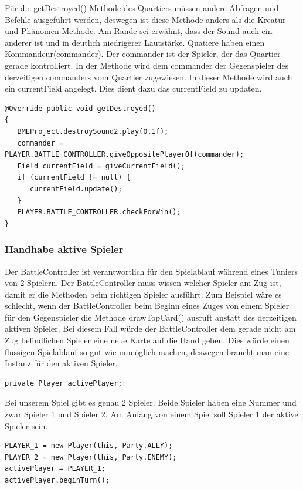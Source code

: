 Für die getDestroyed()-Methode des Quartiers müssen andere Abfragen und Befehle ausgeführt werden, deswegen ist diese Methode anders als die Kreatur- und Phänomen-Methode. Am Rande sei erwähnt, dass der Sound auch ein anderer ist und in deutlich niedrigerer Lautstärke.
Quatiere haben einen Kommandeur(commander). Der commander ist der Spieler, der das Quartier gerade kontrolliert. In der Methode wird dem commander der Gegenspieler des derzeitigen commanders vom Quartier zugewiesen. In dieser Methode wird auch ein currentField angelegt.
Dies dient dazu das currentField zu updaten.

\begin{lstlisting}
@Override public void getDestroyed()
{
   BMEProject.destroySound2.play(0.1f);
   commander = PLAYER.BATTLE_CONTROLLER.giveOppositePlayerOf(commander);
   Field currentField = giveCurrentField();
   if (currentField != null) {
      currentField.update();
   }
   PLAYER.BATTLE_CONTROLLER.checkForWin();
}
\end{lstlisting}

\subsubsection{Handhabe aktive Spieler}
Der BattleController ist verantwortlich für den Spielablauf während eines Tuniers von 2 Spielern. Der BattleController muss wissen welcher Spieler am Zug ist, damit er die Methoden beim richtigen Spieler ausführt. Zum Beispiel wäre es schlecht, wenn der BattleController beim Beginn eines Zuges von einem Spieler für den Gegenspieler die Methode drawTopCard() ausruft anstatt des derzeitigen aktiven Spieler. Bei diesem Fall würde der BattleController dem gerade nicht am Zug befindlichen Spieler eine neue Karte auf die Hand geben. Dies würde einen flüssigen Spielablauf so gut wie unmöglich machen, deswegen braucht man eine Instanz für den aktiven Spieler.

\begin{lstlisting}
private Player activePlayer;
\end{lstlisting}

Bei unserem Spiel gibt es genau 2 Spieler. Beide Spieler haben eine Nummer und zwar Spieler 1 und Spieler 2. Am Anfang von einem Spiel soll Spieler 1 der aktive Spieler sein.

\begin{lstlisting}
PLAYER_1 = new Player(this, Party.ALLY);
PLAYER_2 = new Player(this, Party.ENEMY);
activePlayer = PLAYER_1;
activePlayer.beginTurn();
\end{lstlisting}

